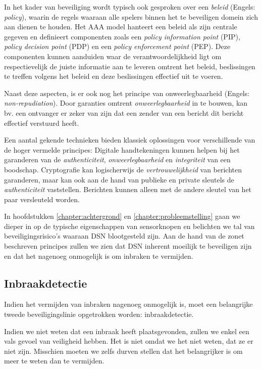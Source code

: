 In het kader van beveiliging wordt typisch ook gesproken over een \emph{beleid}
(Engels: \emph{policy}), waarin de regels waaraan alle spelers binnen het te
beveiligen domein zich aan dienen te houden. Het AAA model hanteert een beleid
als zijn centrale gegeven en definieert componenten zoals een \emph{policy
information point} (PIP), \emph{policy decision point} (PDP) en een
\emph{policy enforcement point} (PEP). Deze componenten kunnen aanduiden waar
de verantwoordelijkheid ligt om respectievelijk de juiste informatie aan te
leveren omtrent het beleid, beslissingen te treffen volgens het beleid en deze
beslissingen effectief uit te voeren.

Naast deze aspecten, is er ook nog het principe van onweerlegbaarheid (Engels:
\emph{non-repudiation}). Door garanties omtrent \emph{onweerlegbaarheid} in te
bouwen, kan bv. een ontvanger er zeker van zijn dat een zender van een bericht
dit bericht effectief verstuurd heeft.

Een aantal gekende technieken bieden klassiek oplossingen voor verschillende
van de hoger vermelde principes: Digitale handtekeningen kunnen helpen bij het
garanderen van de \emph{authenticiteit}, \emph{onweerlegbaarheid} en
\emph{integriteit} van een boodschap. Cryptografie kan logischerwijs de
\emph{vertrouwelijkheid} van berichten garanderen, maar kan ook aan de hand van
publieke en private sleutels de \emph{authenticiteit} vaststellen. Berichten
kunnen alleen met de andere sleutel van het paar versleuteld worden.

In hoofdstukken \ref{chapter:achtergrond} en \ref{chapter:probleemstelling}
gaan we dieper in op de typische eigenschappen van sensorknopen en belichten we
tal van beveiligingsrisico's waaraan DSN blootgesteld zijn. Aan de hand van de
zonet beschreven principes zullen we zien dat DSN inherent moeilijk te
beveiligen zijn en dat het nagenoeg onmogelijk is om inbraken te vermijden.

\subsection{Inbraakdetectie}
\label{subsection:detection}

Indien het vermijden van inbraken nagenoeg onmogelijk is, moet een belangrijke
tweede beveiligingslinie opgetrokken worden: inbraakdetectie.

Indien we niet weten dat een inbraak heeft plaatsgevonden, zullen we enkel een
vals gevoel van veiligheid hebben. Het is niet omdat we het niet weten, dat ze
er niet zijn. Misschien moeten we zelfs durven stellen dat het belangrijker is
om meer te weten dan te vermijden.

